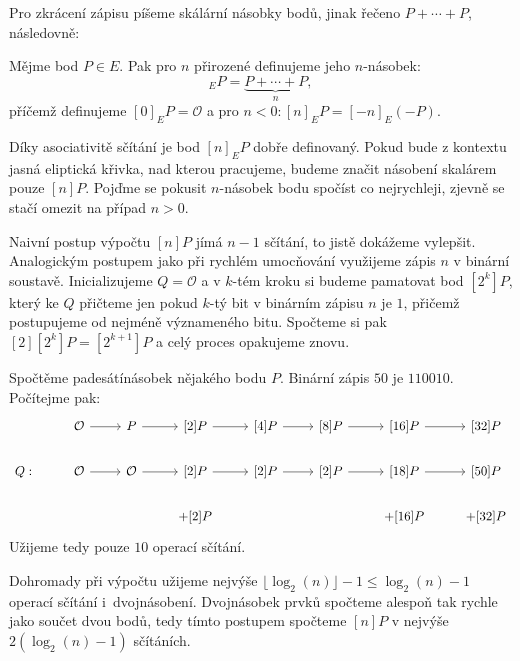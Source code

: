 \documentclass[12pt]{report}
\begin{document}
Pro zkrácení zápisu píšeme skálární násobky bodů, jinak řečeno $P+\cdots+P$, následovně:

\begin{definice}
Mějme bod $P \in E$. Pak pro $n$ přirozené definujeme jeho $n$-násobek:
\begin{equation*}
[n]_E P = \underbrace{P+ \cdots + P}_{n},
\end{equation*}
příčemž definujeme $[0]_E P = \mathcal{O}$ a pro $n < 0: [n]_E P = [-n]_E (-P)$.
\end{definice}

Díky asociativitě sčítání je bod $[n]_EP$ dobře definovaný. Pokud bude z kontextu jasná eliptická křivka, nad kterou pracujeme, budeme značit násobení skalárem pouze $[n]P$. Pojďme se pokusit $n$-násobek bodu spočíst co nejrychleji, zjevně se stačí omezit na případ $n > 0$.

Naivní postup výpočtu $[n] P$ jímá $n-1$ sčítání, to jistě dokážeme vylepšit. Analogickým postupem jako při rychlém umocňování využijeme zápis $n$ v binární soustavě. Inicializujeme $Q = \mathcal{O}$ a v $k$-tém kroku si budeme pamatovat bod $[2^k] P$, který ke $Q$ přičteme jen pokud $k$-tý bit v binárním zápisu $n$ je $1$, přičemž postupujeme od nejméně význameného bitu. Spočteme si pak $[2][2^k] P = [2^{k+1}] P$ a celý proces opakujeme znovu.

\begin{priklad}
Spočtěme padesátínásobek nějakého bodu $P$. Binární zápis $50$ je $110010$. Počítejme pak:
\begin{equation*}
\begin{tikzcd}[arrows=to]
& \mathcal{O} \rar & P \rar & {[2]}P \rar & {[4]}P \rar & {[8]}P \rar & {[16]}P \rar & {[32]} P   \\
Q: &   \mathcal{O} \rar & \mathcal{O} \rar & {[2]}P \rar & {[2]}P \rar & {[2]}P \rar & {[18]}P \rar & {[50]} P   \\
 &  &  & + {[2]}P  & & & + {[16]}P  & +{[32]}P 
    \end{tikzcd} 
\end{equation*}
Užijeme tedy pouze $10$ operací sčítání.
\end{priklad}
 

Dohromady při výpočtu užijeme nejvýše $\lfloor \log_2(n) \rfloor -1 \leqslant \log_2(n)-1$ operací sčítání i~dvojnásobení. Dvojnásobek prvků spočteme alespoň tak rychle jako součet dvou bodů, tedy tímto postupem spočteme $[n]P$ v nejvýše $2( \log_2(n)-1)$ sčítáních.
\end{document}
